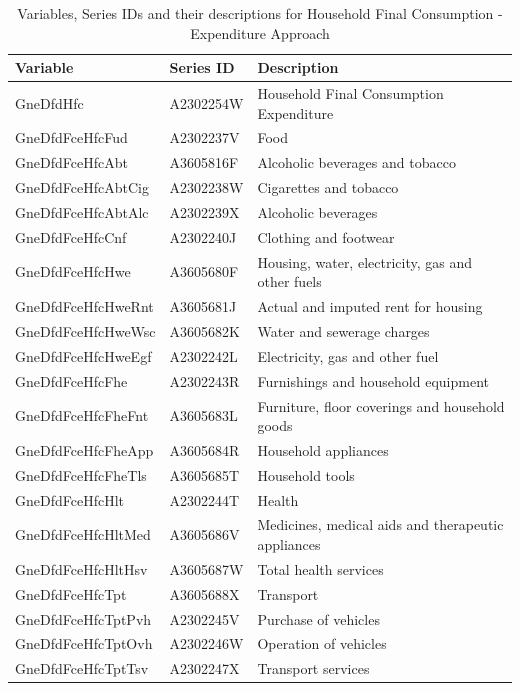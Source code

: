\documentclass[graybox]{svmult}
\begin{document}
\begin{table}
	\caption{Variables, Series IDs and their descriptions for Household Final Consumption - Expenditure Approach}
	\small
	\centering
	\begin{tabular*}{\columnwidth}[width = \textwidth]{lll}
		\toprule
		\textbf{Variable} & \textbf{Series ID} & \textbf{Description}\\
		\midrule
    GneDfdHfc          & A2302254W & Household Final Consumption Expenditure\\
    GneDfdFceHfcFud    & A2302237V & Food\\
    GneDfdFceHfcAbt    & A3605816F & Alcoholic beverages and tobacco\\
    GneDfdFceHfcAbtCig & A2302238W & Cigarettes and tobacco\\
    GneDfdFceHfcAbtAlc & A2302239X & Alcoholic beverages\\
		\addlinespace
    GneDfdFceHfcCnf    & A2302240J & Clothing and footwear\\
    GneDfdFceHfcHwe    & A3605680F & Housing, water, electricity, gas and other fuels\\
    GneDfdFceHfcHweRnt & A3605681J & Actual and imputed rent for housing\\
    GneDfdFceHfcHweWsc & A3605682K & Water and sewerage charges\\
    GneDfdFceHfcHweEgf & A2302242L & Electricity, gas and other fuel\\
		\addlinespace
    GneDfdFceHfcFhe    & A2302243R & Furnishings and household equipment\\
    GneDfdFceHfcFheFnt & A3605683L & Furniture, floor coverings and household goods\\
    GneDfdFceHfcFheApp & A3605684R & Household appliances\\
    GneDfdFceHfcFheTls & A3605685T & Household tools\\
    GneDfdFceHfcHlt    & A2302244T & Health\\
		\addlinespace
    GneDfdFceHfcHltMed & A3605686V & Medicines, medical aids and therapeutic appliances\\
    GneDfdFceHfcHltHsv & A3605687W & Total health services\\
    GneDfdFceHfcTpt    & A3605688X & Transport\\
    GneDfdFceHfcTptPvh & A2302245V & Purchase of vehicles\\
    GneDfdFceHfcTptOvh & A2302246W & Operation of vehicles\\
		\addlinespace
    GneDfdFceHfcTptTsv & A2302247X & Transport services\\

\end{tabular*}
\end{table}
\end{document}
